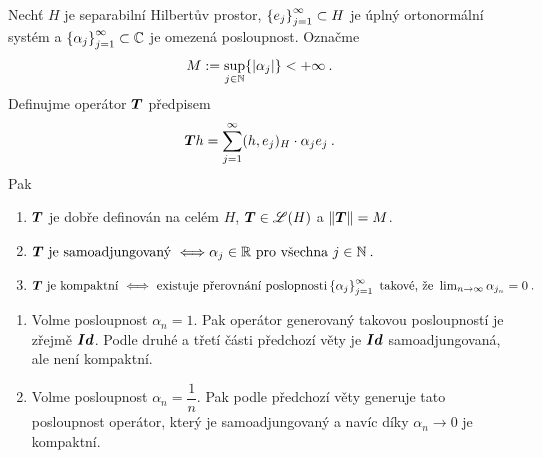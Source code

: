 \begin{theorem} \label{4.rozklad II}
Nechť $H$ je separabilní Hilbertův prostor, $\left \lbrace e_j \right \rbrace_{j=1}^\infty \subset H$ je úplný ortonormální systém a $\left \lbrace \alpha_j \right \rbrace_{j=1}^\infty \subset \mathbb{C}$ je omezená posloupnost. Označme \begin{align*}
    M:= \sup_{j \in \mathbb{N}} \{ |\alpha_j|\} < + \infty \:.
\end{align*}
Definujme operátor $\boldsymbol{T}$ předpisem \begin{align*}
    \boldsymbol{T} h = \sum_{j=1}^\infty (h, e_j)_H \cdot \alpha_j  e_j \:.
\end{align*}
Pak \begin{enumerate}
    \item  $\boldsymbol{T}$ je dobře definován na celém $H$, $\boldsymbol{T} \in \mathscr{L} (H)$ a $\left\lVert\boldsymbol{T}\right\rVert = M$.
    \item $
        \boldsymbol{T} \text{ je samoadjungovaný } \Longleftrightarrow \alpha_j \in \mathbb{R} \text{ pro všechna } j \in \mathbb{N} \:. 
    $
    \item $
        \boldsymbol{T} \text{ je kompaktní } \Longleftrightarrow \text{ existuje přerovnání poslopnosti} \left \lbrace \alpha_j \right \rbrace_{j=1}^\infty \text{ takové, že } \lim_{n \rightarrow \infty} \alpha_{j_n} = 0 \:.
    $
\end{enumerate}
\end{theorem}

\bigskip

\begin{example} 
\begin{enumerate}
    \item Volme posloupnost $\alpha_n=1$. Pak operátor generovaný takovou posloupností je zřejmě $\boldsymbol{Id}$. Podle druhé a třetí části předchozí věty je $\boldsymbol{Id}$ samoadjungovaná, ale není kompaktní.
    \item Volme posloupnost $\alpha_n = \dfrac{1}{n}$. Pak podle předchozí věty generuje tato posloupnost operátor, který je samoadjungovaný a navíc díky $\alpha_n \rightarrow 0$ je kompaktní.
\end{enumerate}
\end{example}

